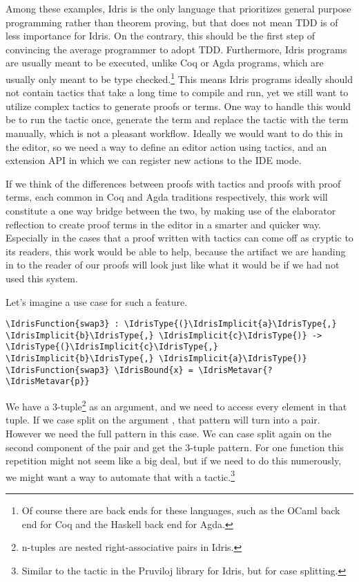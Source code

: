 
Among these examples, Idris is the only language that prioritizes general
purpose programming rather than theorem proving\cite{idrisfaq}, but that does
not mean TDD is of less importance for Idris. On the contrary, this should
be the first step of convincing the average programmer to adopt TDD.
Furthermore, Idris programs are usually meant to be executed, unlike Coq or
Agda programs, which are usually only meant to be type checked.\footnote{Of
  course there are back ends for these languages, such as the OCaml
  back end for Coq and the Haskell back end for Agda.}
This means Idris programs ideally should not contain tactics that take a long
time to compile and run, yet we still want to utilize complex tactics to
generate proofs or terms. One way to handle this would be to run the tactic
once, generate the term and replace the tactic with the term manually, which is
not a pleasant workflow. Ideally we would want to do this in the editor, so we
need a way to define an editor action using tactics, and an extension API in
which we can register new actions to the IDE mode.

If we think of the differences between proofs with tactics and proofs with
proof terms, each common in Coq and Agda traditions respectively,
this work will constitute a one way bridge between the two, by
making use of the elaborator reflection to create proof terms in the editor in
a smarter and quicker way. Especially in the cases that a proof written with
tactics can come off as cryptic to its readers, this work would be able to
help, because the artifact we are handing in to the reader of our proofs
will look just like what it would be if we had not used this system.

Let's imagine a use case for such a feature.
\begin{Verbatim}[commandchars=\\\{\}]
\IdrisFunction{swap3} : \IdrisType{(}\IdrisImplicit{a}\IdrisType{,} \IdrisImplicit{b}\IdrisType{,} \IdrisImplicit{c}\IdrisType{)} -> \IdrisType{(}\IdrisImplicit{c}\IdrisType{,} \IdrisImplicit{b}\IdrisType{,} \IdrisImplicit{a}\IdrisType{)}
\IdrisFunction{swap3} \IdrisBound{x} = \IdrisMetavar{?\IdrisMetavar{p}}
\end{Verbatim}
We have a 3-tuple\footnote{n-tuples are nested right-associative pairs in
Idris.} as an argument, and we need to access every element in that tuple.
If we case split on the argument , that pattern will turn into
a pair. However we need the full  pattern in this
case. We can case split again on the second component of the pair and get the
3-tuple pattern.
For one function this repetition might not seem like a big deal, but if we need
to do this numerously, we might want a way to automate that with a
tactic.\footnote{Similar to the  tactic in the Pruviloj library
for Idris, but for case splitting.}

